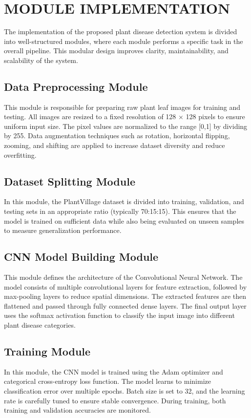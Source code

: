 \documentclass[12pt]{report}
\begin{document}
\section{MODULE IMPLEMENTATION}

The implementation of the proposed plant disease detection system is divided into well-structured modules, where each module performs a specific task in the overall pipeline. This modular design improves clarity, maintainability, and scalability of the system.

\subsection{Data Preprocessing Module}
This module is responsible for preparing raw plant leaf images for training and testing. All images are resized to a fixed resolution of 128 $\times$ 128 pixels to ensure uniform input size. The pixel values are normalized to the range [0,1] by dividing by 255. Data augmentation techniques such as rotation, horizontal flipping, zooming, and shifting are applied to increase dataset diversity and reduce overfitting.

\subsection{Dataset Splitting Module}
In this module, the PlantVillage dataset is divided into training, validation, and testing sets in an appropriate ratio (typically 70:15:15). This ensures that the model is trained on sufficient data while also being evaluated on unseen samples to measure generalization performance.

\subsection{CNN Model Building Module}
This module defines the architecture of the Convolutional Neural Network. The model consists of multiple convolutional layers for feature extraction, followed by max-pooling layers to reduce spatial dimensions. The extracted features are then flattened and passed through fully connected dense layers. The final output layer uses the softmax activation function to classify the input image into different plant disease categories.

\subsection{Training Module}
In this module, the CNN model is trained using the Adam optimizer and categorical cross-entropy loss function. The model learns to minimize classification error over multiple epochs. Batch size is set to 32, and the learning rate is carefully tuned to ensure stable convergence. During training, both training and validation accuracies are monitored.
\end{document}
